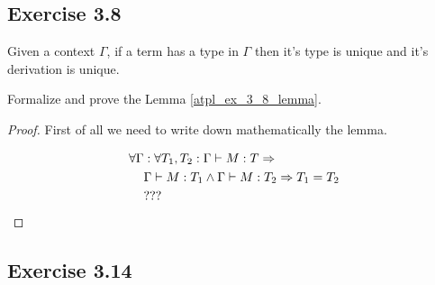 \documentclass[12pt,a4paper,oneside]{book}
\begin{document}
\subsection{Exercise 3.8}

\begin{lemma}
    \label{atpl_ex_3_8_lemma}
    Given a context $\Gamma$, if a term has a type in $\Gamma$ then
    it's type is unique and it's derivation is unique.
\end{lemma}

\begin{exercise}
    Formalize and prove the Lemma \ref{atpl_ex_3_8_lemma}.

    \begin{proof}
        First of all we need to write down mathematically the lemma.

        \begin{equation*}
        \begin{split}
        \forall \Gamma &\mathrel{:} \forall T_1, T_2 \mathrel{:} \Gamma \vdash M : T \Rightarrow \\
        &\Gamma \vdash M:T_1 \land \Gamma \vdash M:T_2 \Rightarrow T_1 = T_2 \\
        & ???
        \end{split}
        \end{equation*}
    \end{proof}
\end{exercise}

\subsection{Exercise 3.14}
\end{document}
